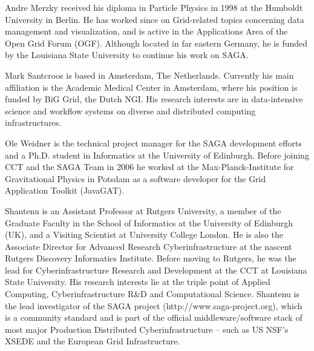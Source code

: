 \documentclass[]{paper}
\begin{document}
Andre Merzky received his diploma in Particle Physics in 1998 at the Humboldt
University in Berlin. He has worked since on Grid-related topics concerning
data management and visualization, and is active in the Applications Area of
the Open Grid Forum (OGF). Although located in far eastern Germany, he is
funded by the Louisiana State University to continue his work on SAGA.

Mark Santcroos is based in Amsterdam, The Netherlands. Currently his main
affiliation is the Academic Medical Center in Amsterdam, where his position is
funded by BiG Grid, the Dutch NGI. His research interests are in
data-intensive science and workflow systems on diverse and distributed
computing infrastructures.

Ole Weidner is the technical project manager for the SAGA development efforts
and a Ph.D. student in Informatics at the University of Edinburgh. Before
joining CCT and the SAGA Team in 2006 he worked at the Max-Planck-Institute
for Gravitational Physics in Potsdam as a software developer for the Grid
Application Toolkit (JavaGAT).

Shantenu is an Assistant Professor at Rutgers University, a member of
the Graduate Faculty in the School of Informatics at the University of
Edinburgh (UK), and a Visiting Scientist at University College
London. He is also the Associate Director for Advanced Research
Cyberinfrastructure at the nascent Rutgers Discovery Informatics
Institute. Before moving to Rutgers, he was the lead for
Cyberinfrastructure Research and Development at the CCT at Louisiana
State University.  His research interests lie at the triple point of
Applied Computing, Cyberinfrastructure R\&D and Computational
Science. Shantenu is the lead investigator of the SAGA project
(http://www.saga-project.org), which is a community standard and is
part of the official middleware/software stack of most major
Production Distributed Cyberinfrastructure -- such as US NSF's XSEDE
and the European Grid Infrastructure.  





\end{document}

